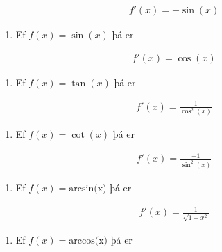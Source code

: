 \documentclass[a4paper,10pt,icelandic]{sphinxmanual}
\begin{document}
\begin{equation*}
\begin{split}f'(x)=-\sin(x)\end{split}
\end{equation*}\begin{enumerate}
%
\setcounter{enumi}{10}
\item {} 
Ef \(f(x)=\sin(x)\) þá er

\end{enumerate}
\begin{equation*}
\begin{split}f'(x)=\cos(x)\end{split}
\end{equation*}\begin{enumerate}
%
\setcounter{enumi}{11}
\item {} 
Ef \(f(x)=\tan(x)\) þá er

\end{enumerate}
\begin{equation*}
\begin{split}f'(x)=\frac{1}{\cos^2(x)}\end{split}
\end{equation*}\begin{enumerate}
%
\setcounter{enumi}{12}
\item {} 
Ef \(f(x)=\cot(x)\) þá er

\end{enumerate}
\begin{equation*}
\begin{split}f'(x)=\frac{-1}{\sin^2(x)}\end{split}
\end{equation*}\begin{enumerate}
%
\setcounter{enumi}{13}
\item {} 
Ef \(f(x)=\text{arcsin(x)}\) þá er

\end{enumerate}
\begin{equation*}
\begin{split}f'(x)=\frac{1}{\sqrt{1-x^2}}\end{split}
\end{equation*}\begin{enumerate}
%
\setcounter{enumi}{14}
\item {} 
Ef \(f(x)=\text{arccos(x)}\) þá er

\end{enumerate}
\end{document}
